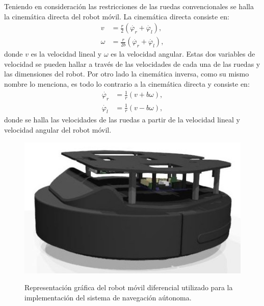 
Teniendo en consideración las restricciones de las ruedas convencionales se halla la 
cinemática directa del robot móvil. La cinemática directa consiste en:
\begin{align*}
v &= \frac{r}{2}(\dot{\varphi_{r}} + \dot{\varphi_{l}}), \\
\omega &= \frac{r}{2b}(\dot{\varphi_{r}} + \dot{\varphi_{l}}),
\end{align*}
donde $v$ es la velocidad lineal y $\omega$ es la velocidad angular. Estas 
dos variables de velocidad se pueden hallar a través de las velocidades
de cada una de las ruedas y las dimensiones del robot. Por otro lado la cinemática 
inversa, como su mismo nombre lo menciona, es todo lo contrario a la
cinemática directa y consiste en: 
\begin{align*}
\dot{\varphi_{r}} &= \frac{1}{r}(v + b\omega), \\
\dot{\varphi_{l}} &= \frac{1}{r}(v - b\omega),
\end{align*}
donde se halla las velocidades de las ruedas a partir de la velocidad lineal y velocidad
angular del robot móvil.
\begin{figure}%
 \centering \footnotesize
 {\includegraphics[width=0.35\linewidth]{images/turtlebot.jpg}}
 \captionsetup{font=footnotesize}
 \caption{Representación gráfica del robot móvil diferencial utilizado para la implementación 
 del sistema de navegación aútonoma.}
 \label{fig:kobuki}
 \end{figure}

